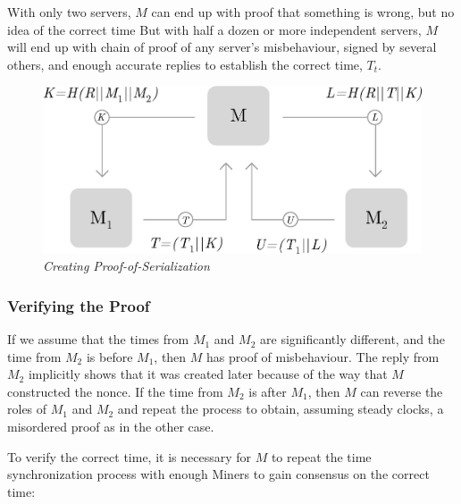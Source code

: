\documentclass[10pt, nonatbib, nocopyrightspace, reprint]{sigplanconf}
\begin{document}
With only two servers, $M$ can end up with proof that something is wrong, but no idea of the correct time But with half a dozen or more independent servers, $M$ will end up with chain of proof of any server's misbehaviour, signed by several others, and enough accurate replies to establish the correct time, $T_t$.

\begin{figure}[ht]
    \begin{center}
          \includegraphics[width=\columnwidth]{serialization.eps}
          \caption{\emph{Creating Proof-of-Serialization}}\label{fig:serialization}
     \end{center}
\end{figure}

\subsubsection{Verifying the Proof}

If we assume that the times from $M_1$ and $M_2$ are significantly different, and the time from $M_2$ is before $M_1$, then $M$ has proof of misbehaviour. The reply from $M_2$ implicitly shows that it was created later because of the way that $M$ constructed the nonce. If the time from $M_2$ is after $M_1$, then $M$ can reverse the roles of $M_1$ and $M_2$ and repeat the process to obtain, assuming steady clocks, a misordered proof as in the other case.

To verify the correct time, it is necessary for $M$ to repeat the time synchronization process with enough Miners to gain consensus on the correct time:
\end{document}
